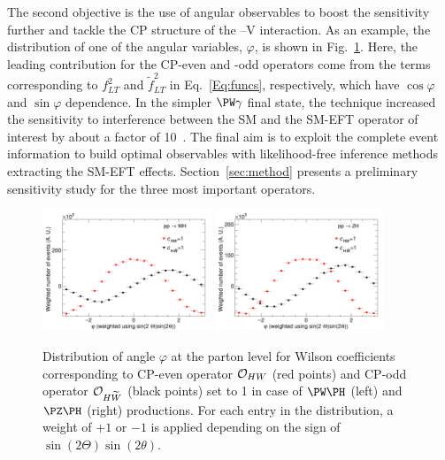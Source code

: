 \documentclass[a4paper,11pt]{article}
\renewcommand{\PV}{{{{V}}}\xspace}
\begin{document}
The second objective is the use of
angular observables to boost the sensitivity further and tackle the CP structure of the \PH--\PV interaction. 
As an example,  the
distribution of one of the angular variables, $\varphi$, is shown in Fig.~\ref{fig:LHE_phi}. 
Here,  the leading contribution for the CP-even and -odd operators come from the terms corresponding to $f^{2}_{LT}$ and $\tilde{f}^2_{LT}$ in Eq.~\eqref{Eq:funcs}, respectively, which have $\cos\varphi$ and $\sin\varphi$ dependence.
In the simpler $\PW\gamma$ final state, the technique increased the sensitivity to interference between the SM and the SM-EFT operator of interest by about a factor of 10~\cite{CMS-PAS-SMP-20-005}.
The final aim is to exploit the complete event information to build optimal observables with likelihood-free inference methods~\cite{Brehmer:2018kdj,Brehmer:2018hga,Chen:2020mev,Chatterjee:2021nms,Chatterjee:2022oco,GomezAmbrosio:2022mpm} extracting the SM-EFT effects.
Section~\ref{sec:method} presents a preliminary sensitivity study for the three most important operators. 

\begin{figure}[tph]
\begin{center}
\includegraphics[width=0.45\textwidth]{Figures/New/LHE/LHE_Plot_phi_WH.png}
\includegraphics[width=0.45\textwidth]{Figures/New/LHE/LHE_Plot_phi_ZH.png}
\end{center}
\caption{
Distribution of angle $\varphi$ at the parton level for Wilson coefficients corresponding to CP-even operator ${\cal O}_{HW}$  (red points) and CP-odd operator ${\cal O}_{H\widetilde{W}}$ (black points) set to 1 in case of $\PW\PH$ (left) and $\PZ\PH$ (right) productions.
For each entry in the distribution, a weight of $+1$ or $-1$ is applied depending on the sign of $\sin\left(2\Theta\right) \sin\left(2\theta\right)$. 
}
\label{fig:LHE_phi}
\end{figure}
\end{document}
